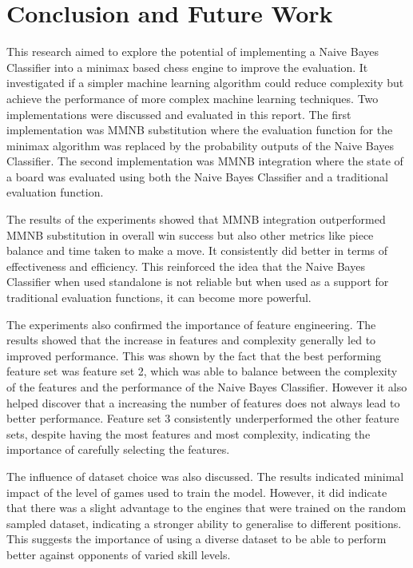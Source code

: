 \chapter{Conclusion and Future Work}

This research aimed to explore the potential of implementing a Naive Bayes Classifier into a minimax based chess engine to improve the evaluation. It investigated if a simpler machine learning algorithm could reduce complexity but achieve the performance of more complex machine learning techniques. Two implementations were discussed and evaluated in this report. The first implementation was MMNB substitution where the evaluation function for the minimax algorithm was replaced by the probability outputs of the Naive Bayes Classifier. The second implementation was MMNB integration where the state of a board was evaluated using both the Naive Bayes Classifier and a traditional evaluation function. 

The results of the experiments showed that MMNB integration outperformed MMNB substitution in overall win success but also other metrics like piece balance and time taken to make a move. It consistently did better in terms of effectiveness and efficiency. This reinforced the idea that the Naive Bayes Classifier when used standalone is not reliable but when used as a support for traditional evaluation functions, it can become more powerful.

The experiments also confirmed the importance of feature engineering. The results showed that the increase in features and complexity generally led to improved performance. This was shown by the fact that the best performing feature set was feature set 2, which was able to balance between the complexity of the features and the performance of the Naive Bayes Classifier. However it also helped discover that a increasing the number of features does not always lead to better performance. Feature set 3 consistently underperformed the other feature sets, despite having the most features and most complexity, indicating the importance of carefully selecting the features. 

The influence of dataset choice was also discussed. The results indicated minimal impact of the level of games used to train the model. However, it did indicate that there was a slight advantage to the engines that were trained on the random sampled dataset, indicating a stronger ability to generalise to different positions. This suggests the importance of using a diverse dataset to be able to perform better against opponents of varied skill levels.  

